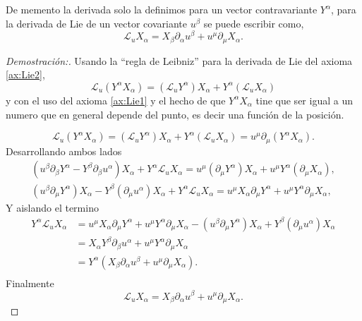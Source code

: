 \noindent De memento la derivada solo la definimos para un vector contravariante $Y^\alpha$, para la derivada de Lie de un vector covariante $u^\beta$ se puede escribir como,  
\begin{equation}
    \mathscr{L}_u X_\alpha=X_\beta \partial_\alpha u^\beta+u^\mu \partial_\mu X_\alpha .
\end{equation}
\begin{proof}[Demostración:]
    Usando la  ``regla de Leibniz'' para la derivada de Lie del axioma \ref{ax:Lie2},
    \begin{equation}
        \mathscr{L}_u\left(Y^\alpha X_\alpha\right)=\left(\mathscr{L}_u Y^\alpha\right) X_{\alpha} + Y^\alpha \left(\mathscr{L}_u X_\alpha\right)
    \end{equation}
    y con el uso del axioma \ref{ax:Lie1} y el hecho de que $Y^\alpha X_\alpha$ tine que ser igual a un numero que en general depende del punto, es decir una función de la posición.

    \begin{equation}
        \mathscr{L}_u\left(Y^\alpha X_\alpha\right)=\left(\mathscr{L}_u Y^\alpha\right) X_\alpha+Y^\alpha\left(\mathscr{L}_u X_\alpha\right)=u^\mu \partial_\mu\left(Y^\alpha X_\alpha\right).
    \end{equation}
    Desarrollando ambos lados
    \begin{align*}
        \left(u^\beta \partial_\beta Y^\alpha-Y^\beta \partial_\beta u^\alpha\right) X_\alpha+Y^\alpha \mathscr{L}_u X_\alpha=u^\mu\left(\partial_\mu Y^\alpha\right) X_\alpha+u^\mu Y^\alpha (\partial_\mu X_\alpha ),\\
        \left(u^\beta \partial_\mu Y^\alpha\right) X_\alpha-Y^\beta\left(\partial_\mu u^\alpha\right) X_\alpha+Y^\alpha \mathscr{L}_u X_\alpha=u^\mu X_\alpha \partial_\mu Y^\alpha+u^\mu Y^\alpha \partial_\mu X_\alpha,
    \end{align*}
    Y aislando el termino 
    \begin{align*}
        Y^\alpha \mathscr{L}_u X_\alpha   & =  u^\mu X_\alpha \partial_\mu Y^\alpha+u^\mu Y^\alpha \partial_\mu X_\alpha  - \left(u^\beta \partial_\mu Y^\alpha\right) X_\alpha + Y^\beta\left(\partial_\mu u^\alpha\right) X_\alpha \\
        & = X_\alpha Y^\beta \partial_\beta u^\alpha+u^\mu Y^\alpha \partial_\mu X_\alpha\\
        & = Y^\alpha\left(X_\beta \partial_\alpha u^\beta+u^\mu \partial_\mu X_\alpha\right).\\
    \end{align*}
    Finalmente
    \begin{equation}
        \mathscr{L}_u X_\alpha  = X_\beta \partial_\alpha u^\beta+u^\mu \partial_\mu X_\alpha.
    \end{equation}
\end{proof}



